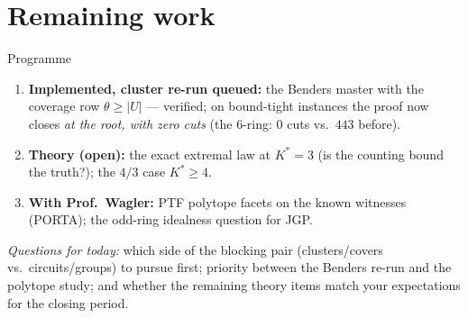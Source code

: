 \documentclass[10pt]{beamer}
\newcommand{\U}{U}\newcommand{\Kst}{K^{\ast}}\newcommand{\Zst}{Z^{\ast}}
\begin{document}
\section{Remaining work}
\begin{frame}{Programme}
\begin{enumerate}
  \item \textbf{Implemented, cluster re-run queued:} the Benders master with
        the coverage row $\theta\ge|\U|$ --- verified; on bound-tight
        instances the proof now closes \emph{at the root, with zero cuts}
        (the $6$-ring: $0$ cuts vs.\ $443$ before).
  \item \textbf{Theory (open):} the exact extremal law at $\Kst=3$
        (is the counting bound the truth?); the $4/3$ case $\Kst\ge4$.
  \item \textbf{With Prof.\ Wagler:} PTF polytope facets on the known
        witnesses (PORTA); the odd-ring idealness question for JGP.
\end{enumerate}
\vspace{2mm}
\emph{Questions for today:} which side of the blocking pair (clusters/covers
vs.\ circuits/groups) to pursue first; priority between the Benders re-run and
the polytope study; and whether the remaining theory items match your
expectations for the closing period.
\end{frame}
\end{document}

